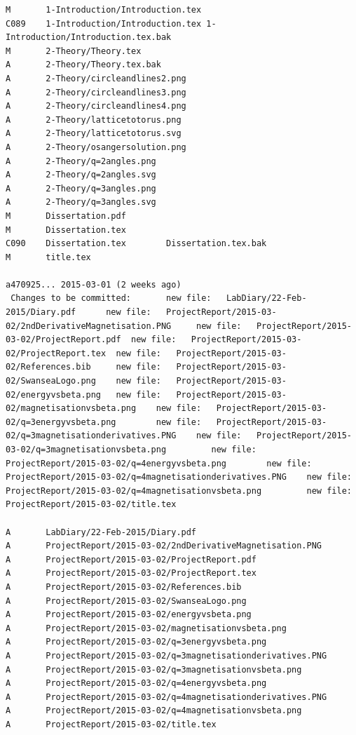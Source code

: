 \documentclass[12pt,a4paper,notitlepage,twoside]{article}
\begin{document}
\begin{lstlisting}[breaklines]
M       1-Introduction/Introduction.tex
C089    1-Introduction/Introduction.tex 1-Introduction/Introduction.tex.bak
M       2-Theory/Theory.tex
A       2-Theory/Theory.tex.bak
A       2-Theory/circleandlines2.png
A       2-Theory/circleandlines3.png
A       2-Theory/circleandlines4.png
A       2-Theory/latticetotorus.png
A       2-Theory/latticetotorus.svg
A       2-Theory/osangersolution.png
A       2-Theory/q=2angles.png
A       2-Theory/q=2angles.svg
A       2-Theory/q=3angles.png
A       2-Theory/q=3angles.svg
M       Dissertation.pdf
M       Dissertation.tex
C090    Dissertation.tex        Dissertation.tex.bak
M       title.tex

a470925... 2015-03-01 (2 weeks ago)
 Changes to be committed:       new file:   LabDiary/22-Feb-2015/Diary.pdf      new file:   ProjectReport/2015-03-02/2ndDerivativeMagnetisation.PNG     new file:   ProjectReport/2015-03-02/ProjectReport.pdf  new file:   ProjectReport/2015-03-02/ProjectReport.tex  new file:   ProjectReport/2015-03-02/References.bib     new file:   ProjectReport/2015-03-02/SwanseaLogo.png    new file:   ProjectReport/2015-03-02/energyvsbeta.png   new file:   ProjectReport/2015-03-02/magnetisationvsbeta.png    new file:   ProjectReport/2015-03-02/q=3energyvsbeta.png        new file:   ProjectReport/2015-03-02/q=3magnetisationderivatives.PNG    new file:   ProjectReport/2015-03-02/q=3magnetisationvsbeta.png         new file:   ProjectReport/2015-03-02/q=4energyvsbeta.png        new file:   ProjectReport/2015-03-02/q=4magnetisationderivatives.PNG    new file:   ProjectReport/2015-03-02/q=4magnetisationvsbeta.png         new file:   ProjectReport/2015-03-02/title.tex

A       LabDiary/22-Feb-2015/Diary.pdf
A       ProjectReport/2015-03-02/2ndDerivativeMagnetisation.PNG
A       ProjectReport/2015-03-02/ProjectReport.pdf
A       ProjectReport/2015-03-02/ProjectReport.tex
A       ProjectReport/2015-03-02/References.bib
A       ProjectReport/2015-03-02/SwanseaLogo.png
A       ProjectReport/2015-03-02/energyvsbeta.png
A       ProjectReport/2015-03-02/magnetisationvsbeta.png
A       ProjectReport/2015-03-02/q=3energyvsbeta.png
A       ProjectReport/2015-03-02/q=3magnetisationderivatives.PNG
A       ProjectReport/2015-03-02/q=3magnetisationvsbeta.png
A       ProjectReport/2015-03-02/q=4energyvsbeta.png
A       ProjectReport/2015-03-02/q=4magnetisationderivatives.PNG
A       ProjectReport/2015-03-02/q=4magnetisationvsbeta.png
A       ProjectReport/2015-03-02/title.tex

\end{lstlisting}
\end{document}

